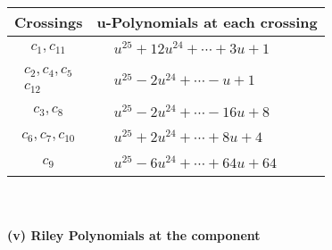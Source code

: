 \documentclass[1p]{elsarticle_modified}
\theoremstyle{definition}
\begin{document}
\begin{tabular}{m{50pt}|m{274pt}}
Crossings & \hspace{64pt}u-Polynomials at each crossing \\
\hline $$\begin{aligned}c_{1},c_{11}\end{aligned}$$&$\begin{aligned}
&u^{25}+12 u^{24}+\cdots+3 u+1
\end{aligned}$\\
\hline $$\begin{aligned}c_{2},c_{4},c_{5}\\c_{12}\end{aligned}$$&$\begin{aligned}
&u^{25}-2 u^{24}+\cdots- u+1
\end{aligned}$\\
\hline $$\begin{aligned}c_{3},c_{8}\end{aligned}$$&$\begin{aligned}
&u^{25}-2 u^{24}+\cdots-16 u+8
\end{aligned}$\\
\hline $$\begin{aligned}c_{6},c_{7},c_{10}\end{aligned}$$&$\begin{aligned}
&u^{25}+2 u^{24}+\cdots+8 u+4
\end{aligned}$\\
\hline $$\begin{aligned}c_{9}\end{aligned}$$&$\begin{aligned}
&u^{25}-6 u^{24}+\cdots+64 u+64
\end{aligned}$\\
\hline
\end{tabular}\\~\\
\newpage\renewcommand{\arraystretch}{1}
\flushleft \textbf{(v) Riley Polynomials at the component}\newline \\
\end{document}
